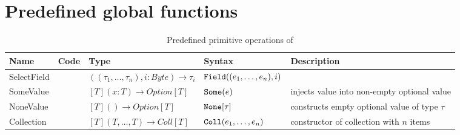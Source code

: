 \section{Predefined global functions}
\label{sec:appendix:primops}

\begin{table}[h]
    \tiny
    \begin{tabu}{|l |l |l |l |l |}
	\hline
	\rowfont{\bfseries}
Name &   Code   &  Type  & Syntax & Description \\
	\hline
SelectField		&	& $((\tau_1,\dots,\tau_n), i: Byte) \to \tau_i$	&	$\SelectField{(e_1,\dots,e_n)}{i}$	&  \\
	\hline
SomeValue		&	& $[T](x: T) \to Option[T]$	& $\Some{e}$ 	& injects value into non-empty optional value \\
	\hline
NoneValue		&	& $[T]()\to Option[T]$		& $\None{\tau}$	& constructs empty optional value of type $\tau$ \\
	\hline
Collection	&	& $[T](T, \dots, T)\to Coll[T]$	& $\Coll{e_1,\dots,e_n}$ & constructor of collection with $n$ items \\
    \hline
    \end{tabu}
    \caption{Predefined primitive operations of \langname}
    \label{table:primops}
\end{table}

